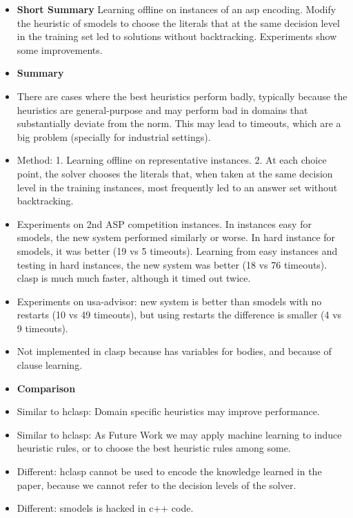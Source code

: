 \begin{itemize}
	\item \textbf{Short Summary}
				Learning offline on instances of an asp encoding.
				Modify the heuristic of smodels to choose the literals that at the same decision level in the training set led to solutions
				without backtracking. Experiments show some improvements. 
	\item \textbf{Summary}
	\item There are cases where the best heuristics perform badly, 
	      typically because the heuristics are general-purpose and may perform bad in domains that substantially deviate from the norm.
	      This may lead to timeouts, which are a big problem (specially for industrial settings).
	\item Method: 1. Learning offline on representative instances. 2. At each choice point, the solver chooses the literals that, 
	      when taken at the same decision level in the training instances, most frequently led to an answer set without backtracking.
	\item Experiments on 2nd ASP competition instances. 
	      In instances easy for smodels, the new system performed similarly or worse. In hard instance for smodels, it was better (19 vs 5 timeouts). 
	      Learning from easy instances and testing in hard instances, the new system was better (18 vs 76 timeouts). 
	      clasp is much much faster, although it timed out twice.
	\item Experiments on usa-advisor: new system is better than smodels with no restarts (10 vs 49 timeouts), 
	      but using restarts the difference is smaller (4 vs 9 timeouts).  
	\item Not implemented in clasp because has variables for bodies, 
	      and because of clause learning.
	\item \textbf{Comparison}
	\item Similar to hclasp: Domain specific heuristics may improve performance.
	\item Similar to hclasp: As Future Work we may apply machine learning to induce heuristic rules, 
	      or to choose the best heuristic rules among some.
	\item Different: hclasp cannot be used to encode the knowledge learned in the paper, 
	      because we cannot refer to the decision levels of the solver.
	\item Different: smodels is hacked in c++ code.
\end{itemize}

